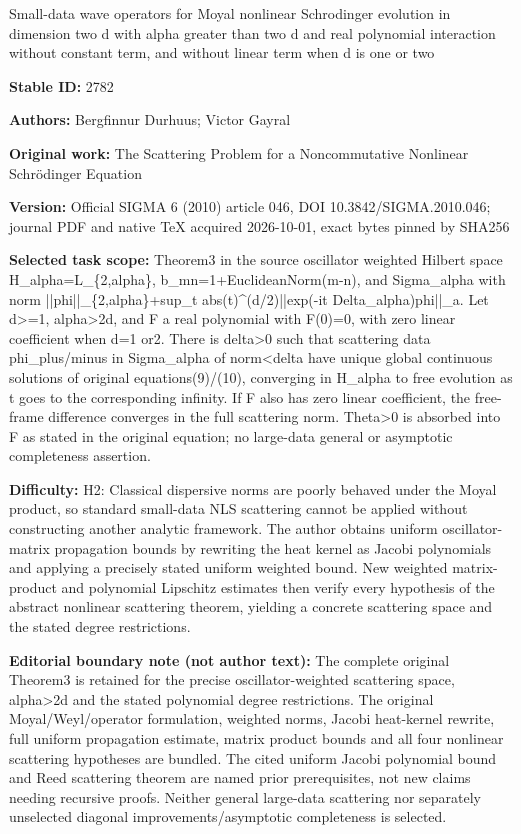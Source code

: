 \documentclass[11pt]{article}
\begin{document}
\begin{center}\Large Small-data wave operators for Moyal nonlinear Schrodinger evolution in dimension two d with alpha greater than two d and real polynomial interaction without constant term, and without linear term when d is one or two\end{center}
\noindent\textbf{Stable ID:} 2782\par
\noindent\textbf{Authors:} Bergfinnur Durhuus; Victor Gayral\par
\noindent\textbf{Original work:} The Scattering Problem for a Noncommutative Nonlinear Schrödinger Equation\par
\noindent\textbf{Version:} Official SIGMA 6 (2010) article 046, DOI 10.3842/SIGMA.2010.046; journal PDF and native TeX acquired 2026-10-01, exact bytes pinned by SHA256\par
\noindent\textbf{Selected task scope:} Theorem3 in the source oscillator weighted Hilbert space H\_alpha=\allowbreak{}L\_\{2,alpha\}, b\_mn=\allowbreak{}1+\allowbreak{}EuclideanNorm(m-n), and Sigma\_alpha with norm ||phi||\_\{2,alpha\}+\allowbreak{}sup\_t abs(t)\textasciicircum{}(d/2)||exp(-it Delta\_alpha)phi||\_a. Let d>=\allowbreak{}1, alpha>2d, and F a real polynomial with F(0)=\allowbreak{}0, with zero linear coefficient when d=\allowbreak{}1 or2. There is delta>0 such that scattering data phi\_plus/minus in Sigma\_alpha of norm<delta have unique global continuous solutions of original equations(9)/(10), converging in H\_alpha to free evolution as t goes to the corresponding infinity. If F also has zero linear coefficient, the free-frame difference converges in the full scattering norm. Theta>0 is absorbed into F as stated in the original equation; no large-data general or asymptotic completeness assertion.\par
\noindent\textbf{Difficulty:} H2: Classical dispersive norms are poorly behaved under the Moyal product, so standard small-data NLS scattering cannot be applied without constructing another analytic framework. The author obtains uniform oscillator-matrix propagation bounds by rewriting the heat kernel as Jacobi polynomials and applying a precisely stated uniform weighted bound. New weighted matrix-product and polynomial Lipschitz estimates then verify every hypothesis of the abstract nonlinear scattering theorem, yielding a concrete scattering space and the stated degree restrictions.\par
\noindent\textbf{Editorial boundary note (not author text):} The complete original Theorem3 is retained for the precise oscillator-weighted scattering space, alpha>2d and the stated polynomial degree restrictions. The original Moyal/Weyl/operator formulation, weighted norms, Jacobi heat-kernel rewrite, full uniform propagation estimate, matrix product bounds and all four nonlinear scattering hypotheses are bundled. The cited uniform Jacobi polynomial bound and Reed scattering theorem are named prior prerequisites, not new claims needing recursive proofs. Neither general large-data scattering nor separately unselected diagonal improvements/asymptotic completeness is selected.\par
\end{document}

